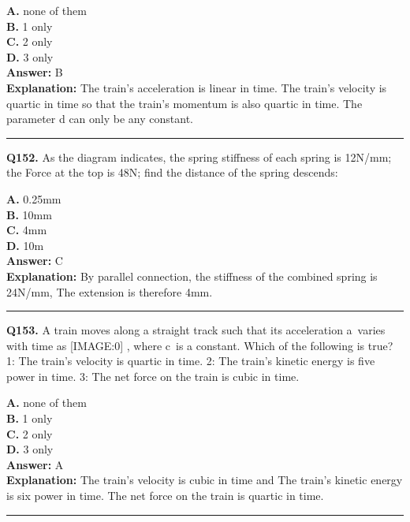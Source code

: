 \documentclass[12pt]{article}
\begin{document}
\textbf{A.} none of them \\
\textbf{B.} 1 only \\
\textbf{C.} 2 only \\
\textbf{D.} 3 only \\

\textbf{Answer:} B \\
\textbf{Explanation:} The train's acceleration is linear in time. The train's velocity is quartic in time so that the train's momentum is also quartic in time. The parameter d can only be any constant.

\hrule
\vspace{1em}


\noindent
\textbf{Q152.} As the diagram indicates, the spring stiffness of each spring is 12N/mm; the Force at the top is 48N; find the distance of the spring descends:



\textbf{A.} 0.25mm \\
\textbf{B.} 10mm \\
\textbf{C.} 4mm \\
\textbf{D.} 10m \\

\textbf{Answer:} C \\
\textbf{Explanation:} By parallel connection, the stiffness of the combined spring is 24N/mm, The extension is therefore 4mm.

\hrule
\vspace{1em}


\noindent
\textbf{Q153.} A train moves along a straight track such that its acceleration a varies with time as
[IMAGE:0]
, where c is a constant. Which of the following is true?
1: The train's velocity is quartic in time.
2: The train's kinetic energy is five power in time.
3: The net force on the train is cubic in time.



\textbf{A.} none of them \\
\textbf{B.} 1 only \\
\textbf{C.} 2 only \\
\textbf{D.} 3 only \\

\textbf{Answer:} A \\
\textbf{Explanation:} The train's velocity is cubic in time and The train's kinetic energy is six power in time. The net force on the train is quartic in time.

\hrule
\vspace{1em}
\end{document}
